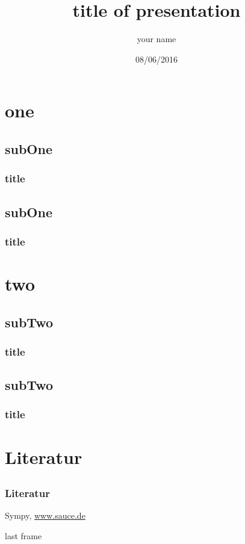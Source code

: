 \documentclass[compress]{beamer}
\title{title of presentation}
\author{your name}
\institute[label]{university \\major}
\date{08/06/2016}
\begin{document}
{
\begin{frame}
\titlepage
\end{frame}
}
\addtocounter{framenumber}{-1}

\begin{frame}
\tableofcontents[hideallsubsections]
\end{frame}


\section{one}

\subsection{subOne}
\begin{frame}[fragile]
\frametitle{title}
\end{frame}

\subsection{subOne}
\begin{frame}
\frametitle{title}
\end{frame}

\section{two}

\subsection{subTwo}
\begin{frame}
\frametitle{title}	
\end{frame}

\subsection{subTwo}
\begin{frame}
\frametitle{title}
\end{frame}

\section{Literatur}
\subsection*{}

\begin{frame}
\frametitle{Literatur}
\begin{small}
\begin{thebibliography}{50}
 Sympy, \url{www.sauce.de}		
\end{thebibliography}
\end{small}
\end{frame}

\begin{frame}
last frame
\end{frame}
\end{document}
